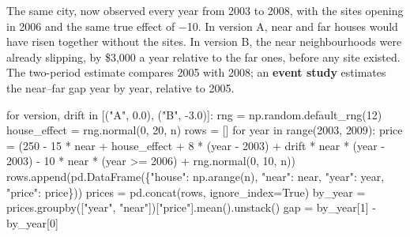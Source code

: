 \documentclass[
  letterpaper,
  10pt,
  twoside,
  openright,
  numbers=noenddot,
  chapterprefix=true]{scrbook}
\newenvironment{Shaded}{}{}
\newcommand{\BuiltInTok}[1]{\textcolor[rgb]{0.84,0.23,0.29}{#1}}
\newcommand{\ControlFlowTok}[1]{\textcolor[rgb]{0.84,0.23,0.29}{#1}}
\newcommand{\DecValTok}[1]{\textcolor[rgb]{0.00,0.36,0.77}{#1}}
\newcommand{\FloatTok}[1]{\textcolor[rgb]{0.00,0.36,0.77}{#1}}
\newcommand{\KeywordTok}[1]{\textcolor[rgb]{0.84,0.23,0.29}{#1}}
\newcommand{\NormalTok}[1]{\textcolor[rgb]{0.14,0.16,0.18}{#1}}
\newcommand{\OperatorTok}[1]{\textcolor[rgb]{0.14,0.16,0.18}{#1}}
\newcommand{\StringTok}[1]{\textcolor[rgb]{0.01,0.18,0.38}{#1}}
\newcommand{\VariableTok}[1]{\textcolor[rgb]{0.89,0.38,0.04}{#1}}
\begin{document}
The same city, now observed every year from 2003 to 2008, with the sites
opening in 2006 and the same true effect of −10. In version A, near and
far houses would have risen together without the sites. In version B,
the near neighbourhoods were already slipping, by \$3,000 a year
relative to the far ones, before any site existed. The two-period
estimate compares 2005 with 2008; an \textbf{event study} estimates the
near--far gap year by year, relative to 2005.

\label{check-housing-trends}
\begin{Shaded}
\begin{Highlighting}[]
\ControlFlowTok{for}\NormalTok{ version, drift }\KeywordTok{in}\NormalTok{ [(}\StringTok{"A"}\NormalTok{, }\FloatTok{0.0}\NormalTok{), (}\StringTok{"B"}\NormalTok{, }\OperatorTok{{-}}\FloatTok{3.0}\NormalTok{)]:}
\NormalTok{    rng }\OperatorTok{=}\NormalTok{ np.random.default\_rng(}\DecValTok{12}\NormalTok{)}
\NormalTok{    house\_effect }\OperatorTok{=}\NormalTok{ rng.normal(}\DecValTok{0}\NormalTok{, }\DecValTok{20}\NormalTok{, n)}
\NormalTok{    rows }\OperatorTok{=}\NormalTok{ []}
    \ControlFlowTok{for}\NormalTok{ year }\KeywordTok{in} \BuiltInTok{range}\NormalTok{(}\DecValTok{2003}\NormalTok{, }\DecValTok{2009}\NormalTok{):}
\NormalTok{        price }\OperatorTok{=}\NormalTok{ (}\DecValTok{250} \OperatorTok{{-}} \DecValTok{15} \OperatorTok{*}\NormalTok{ near }\OperatorTok{+}\NormalTok{ house\_effect }\OperatorTok{+} \DecValTok{8} \OperatorTok{*}\NormalTok{ (year }\OperatorTok{{-}} \DecValTok{2003}\NormalTok{)}
                 \OperatorTok{+}\NormalTok{ drift }\OperatorTok{*}\NormalTok{ near }\OperatorTok{*}\NormalTok{ (year }\OperatorTok{{-}} \DecValTok{2003}\NormalTok{)}
                 \OperatorTok{{-}} \DecValTok{10} \OperatorTok{*}\NormalTok{ near }\OperatorTok{*}\NormalTok{ (year }\OperatorTok{\textgreater{}=} \DecValTok{2006}\NormalTok{) }\OperatorTok{+}\NormalTok{ rng.normal(}\DecValTok{0}\NormalTok{, }\DecValTok{10}\NormalTok{, n))}
\NormalTok{        rows.append(pd.DataFrame(\{}\StringTok{"house"}\NormalTok{: np.arange(n), }\StringTok{"near"}\NormalTok{: near, }\StringTok{"year"}\NormalTok{: year, }\StringTok{"price"}\NormalTok{: price\}))}
\NormalTok{    prices }\OperatorTok{=}\NormalTok{ pd.concat(rows, ignore\_index}\OperatorTok{=}\VariableTok{True}\NormalTok{)}
\NormalTok{    by\_year }\OperatorTok{=}\NormalTok{ prices.groupby([}\StringTok{"year"}\NormalTok{, }\StringTok{"near"}\NormalTok{])[}\StringTok{"price"}\NormalTok{].mean().unstack()}
\NormalTok{    gap }\OperatorTok{=}\NormalTok{ by\_year[}\DecValTok{1}\NormalTok{] }\OperatorTok{{-}}\NormalTok{ by\_year[}\DecValTok{0}\NormalTok{]}

\end{Highlighting}
\end{Shaded}
\end{document}
